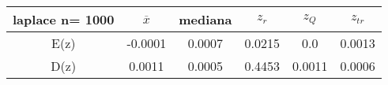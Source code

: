 \begin{tabular}{|c|c|c|c|c|c|}
\hline
laplace n= 1000& $\overline{x}$ & mediana & $z_r$ & $z_Q$ & $z_{tr}$ \\ \hline
E(z) & -0.0001 & 0.0007 & 0.0215 & 0.0 & 0.0013 \\ \hline
D(z) & 0.0011 & 0.0005 & 0.4453 & 0.0011 & 0.0006 \\ \hline
\end{tabular}
